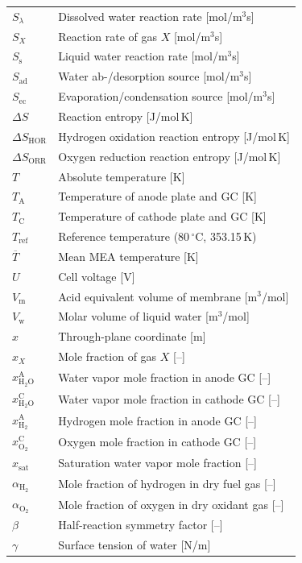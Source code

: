 \documentclass[fontsize=9pt,DIV=calc,a4paper,twocolumn]{scrartcl}
\begin{document}
\begin{xtabular}{@{}ll@{}}
$S_\lambda$ & Dissolved water reaction rate [mol/m$^3$s]\\
$S_X$ & Reaction rate of gas $X$ [mol/m$^3$s]\\
$S_\mathrm{s}$ & Liquid water reaction rate [mol/m$^3$s]\\
$S_\mathrm{ad}$ & Water ab-/desorption source [mol/m$^3$s]\\
$S_\mathrm{ec}$ & Evaporation/condensation source [mol/m$^3$s]\\
$\Delta S$ & Reaction entropy [J/mol\,K]\\
$\Delta S_\mathrm{HOR}$ & Hydrogen oxidation reaction entropy [J/mol\,K]\\
$\Delta S_\mathrm{ORR}$ & Oxygen reduction reaction entropy [J/mol\,K]\\
$T$ & Absolute temperature [K]\\
$T_\mathrm{A}$ & Temperature of anode plate and GC [K]\\
$T_\mathrm{C}$ & Temperature of cathode plate and GC [K]\\
$T_\mathrm{ref}$ & Reference temperature (80\,$^\circ$C, 353.15\,K)\\
$\overline{T}$ & Mean MEA temperature [K]\\
$U$ & Cell voltage [V]\\
$V_\mathrm{m}$ & Acid equivalent volume of membrane [m$^3$/mol]\\
$V_\mathrm{w}$ & Molar volume of liquid water [m$^3$/mol]\\
$x$ & Through-plane coordinate [m]\\
$x_X$ & Mole fraction of gas $X$ [--]\\
$x_{\mathrm{H}_2\mathrm{O}}^\mathrm{A}$ & Water vapor mole fraction in anode GC [--]\\
$x_{\mathrm{H}_2\mathrm{O}}^\mathrm{C}$ & Water vapor mole fraction in cathode GC [--]\\
$x_{\mathrm{H}_2}^\mathrm{A}$ & Hydrogen mole fraction in anode GC [--]\\
$x_{\mathrm{O}_2}^\mathrm{C}$ & Oxygen mole fraction in cathode GC [--]\\
$x_\mathrm{sat}$ & Saturation water vapor mole fraction [--]\\
$\alpha_{\mathrm{H}_2}$ & Mole fraction of hydrogen in dry fuel gas [--]\\
$\alpha_{\mathrm{O}_2}$ & Mole fraction of oxygen in dry oxidant gas [--]\\
$\beta$ & Half-reaction symmetry factor [--]\\
$\gamma$ & Surface tension of water [N/m]\\

\end{xtabular}
\end{document}
